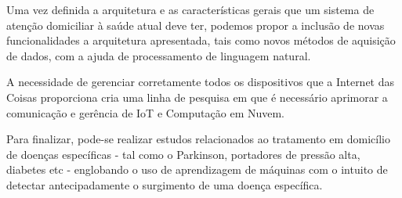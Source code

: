 Uma vez definida a arquitetura e as características gerais que um sistema de
atenção domiciliar à saúde atual deve ter, podemos propor a inclusão de
novas funcionalidades a arquitetura apresentada, tais como novos métodos
de aquisição de dados, com a ajuda de processamento de linguagem natural.

A necessidade de gerenciar corretamente todos os dispositivos que a Internet
das Coisas proporciona cria uma linha de pesquisa em que é necessário aprimorar
a comunicação e gerência de IoT e Computação em Nuvem.

Para finalizar, pode-se realizar estudos relacionados ao tratamento em domicílio de
doenças específicas - tal como o Parkinson, portadores de pressão alta,
diabetes etc - englobando o uso de aprendizagem de máquinas com o intuito de detectar
antecipadamente o surgimento de uma doença específica.
